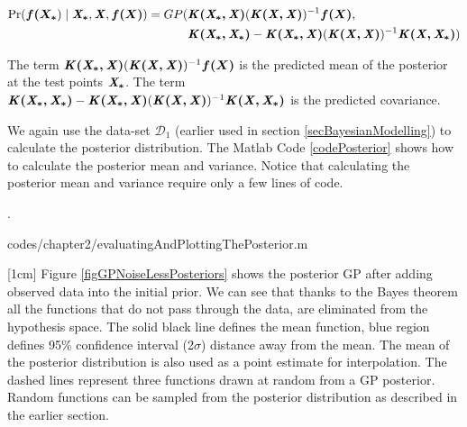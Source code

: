   \begin{equation}\label{eqNoiseFreePosteriorGP}
  \begin{aligned}
  \Pr(\boldsymbol{f(X_{*}}) \mid \bm{\mathit{X_{*}}}, \bm{\mathit{X}}, \boldsymbol{f(X)}) = GP(  & \bm{\mathit{K(X_{*}, X)}}( \bm{\mathit{K(X, X)}} )^{-1}\boldsymbol{f(X)},   \\ 
                                & \bm{\mathit{K(X_{*}, X_{*})}} - \bm{\mathit{K(X_{*}, X)}}( \bm{\mathit{K(X, X)}} )^{-1} \bm{\mathit{K(X, X_{*})}})
  \end{aligned}
  \end{equation}

The term $\bm{\mathit{K(X_{*}, X)}}( \bm{\mathit{K(X, X)}} )^{-1}\boldsymbol{f(X)}$ is the predicted mean of the posterior at the test points $\bm{\mathit{X_{*}}}$. The term $ \bm{\mathit{K(X_{*}, X_{*})}} - \bm{\mathit{K(X_{*}, X)}}( \bm{\mathit{K(X, X)}} )^{-1} \bm{\mathit{K(X, X_{*})}}$ is the predicted covariance. 

We again use the data-set $\mathcal{D}_{1}$ (earlier used in section \ref{secBayesianModelling}) to calculate the posterior distribution. The Matlab Code \ref{codePosterior} shows how to calculate the posterior mean and variance. Notice that calculating the posterior mean and variance require only a few lines of code. 

.%
\begin{mdframed}[hidealllines=true,backgroundcolor=lightgray!20]

                    {codes/chapter2/evaluatingAndPlottingThePosterior.m}
\end{mdframed}

[1cm]
Figure \ref{figGPNoiseLessPosteriors} shows the posterior GP after adding observed data into the initial prior. We can see that thanks to the Bayes theorem all the functions that do not pass through the data, are eliminated from the hypothesis space. The solid black line defines the mean function, blue region defines 95\% confidence interval (2$\sigma$) distance away from the mean. The mean of the posterior distribution is also used as a point estimate for interpolation. The dashed lines represent three functions drawn at random from a GP posterior. Random functions can be sampled from the posterior distribution as described in the earlier section. 


